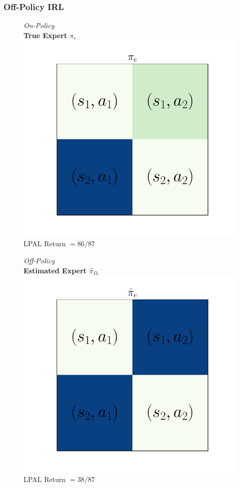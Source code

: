\documentclass{beamer}
\begin{document}
\begin{frame}
\frametitle{Off-Policy IRL}
\begin{figure}
  \begin{center}
  \begin{minipage}{0.45\linewidth}
    \centering
    \emph{On-Policy}\\
    \textbf{True Expert $\pi_e$}
    \includegraphics[width=\linewidth]{./plots/all_state/ue.pdf}
    LPAL Return $= 86/87$
  \end{minipage}
  \begin{minipage}{0.45\linewidth}
    \centering
    \emph{Off-Policy}\\
    \textbf{Estimated Expert $\hat{\pi}_{D_e}$}
    \includegraphics[width=\linewidth]{./plots/all_state/uehat.pdf}
    LPAL Return $= 38/87$
  \end{minipage}
  \end{center}
\end{figure}
\end{frame}
\end{document}
